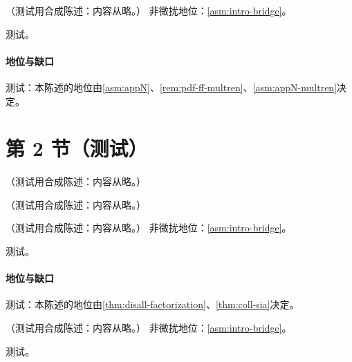 \begin{theorem}\label{thm:coll-sia}
（测试用合成陈述：内容从略。）
非微扰地位：\cref{asm:intro-bridge}。
\end{theorem}
\begin{proofsketch}测试。\end{proofsketch}
\paragraph{地位与缺口}测试：本陈述的地位由\cref{asm:appN}、\cref{rem:pdf-ff-multren}、\cref{asm:appN-multren}决定。

\section{第 2 节（测试）}\label{sec:coll-sidis}

\begin{remark}[系数函数与检验]\label{rem:coll-sia-nlo}
（测试用合成陈述：内容从略。）
\end{remark}

\begin{example}[领头阶 $e^+e^-\to hX$]\label{ex:coll-sia-lo}
（测试用合成陈述：内容从略。）
\end{example}

\begin{theorem}\label{thm:coll-sidis}
（测试用合成陈述：内容从略。）
非微扰地位：\cref{asm:intro-bridge}。
\end{theorem}
\begin{proofsketch}测试。\end{proofsketch}
\paragraph{地位与缺口}测试：本陈述的地位由\cref{thm:disall-factorization}、\cref{thm:coll-sia}决定。

\begin{theorem}\label{thm:coll-direct-photo}
（测试用合成陈述：内容从略。）
非微扰地位：\cref{asm:intro-bridge}。
\end{theorem}
\begin{proofsketch}测试。\end{proofsketch}
